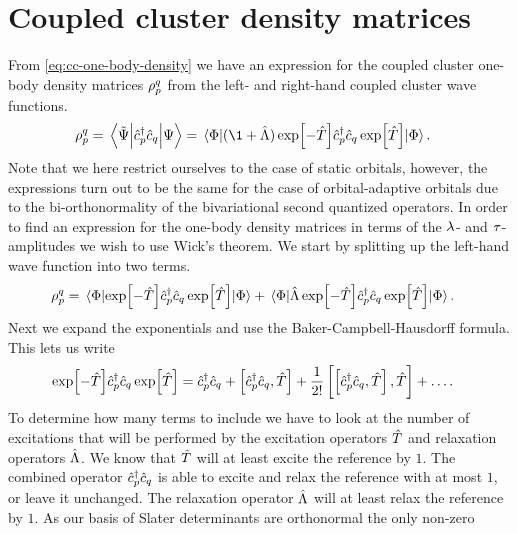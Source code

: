 \chapter{Coupled cluster density matrices}
    \label{app:cc-density-matrices}
    From \autoref{eq:cc-one-body-density} we have an expression for the coupled
    cluster one-body density matrices $\rho^q_p$ from the left- and
    right-hand coupled cluster wave functions.
    \begin{align}
        \densityten^{q}_{p}
        &= \mel{\tilde{\Psi}}{\ccr{p}\can{q}}{\Psi}
        = \mel{\slat}{
            (\1 + \clustl)
            \exp[-\clust]
            \ccr{p}\can{q}
            \exp[\clust]
        }{\slat}.
    \end{align}
    Note that we here restrict ourselves to the case of static orbitals,
    however, the expressions turn out to be the same for the case of
    orbital-adaptive orbitals due to the bi-orthonormality of the bivariational
    second quantized operators.
    In order to find an expression for the one-body density matrices in terms of
    the $\lambda$- and $\tau$-amplitudes we wish to use Wick's theorem.
    We start by splitting up the left-hand wave function into two terms.
    \begin{align}
        \rho^q_p
        &= \mel{\Phi}{
            \exp[-\hat{T}]
            \hat{c}_{p}^{\dagger}\hat{c}_{q}
            \exp[\hat{T}]
        }{\Phi}
        + \mel{\Phi}{
            \hat{\Lambda}\exp[-\hat{T}]
            \hat{c}_{p}^{\dagger}\hat{c}_{q}
            \exp[\hat{T}]
        }{\Phi}.
    \end{align}
    Next we expand the exponentials and use the Baker-Campbell-Hausdorff
    formula.
    This lets us write
    \begin{align}
        \exp[-\hat{T}]
        \hat{c}_{p}^{\dagger}\hat{c}_{q}
        \exp[\hat{T}]
        &= \hat{c}_{p}^{\dagger}\hat{c}_{q}
        + \left[\hat{c}_{p}^{\dagger}\hat{c}_{q}, \hat{T}\right]
        + \frac{1}{2!}\left[\left[\hat{c}_{p}^{\dagger}\hat{c}_{q}, \hat{T}\right], \hat{T}\right]
        + \dots.
    \end{align}
    To determine how many terms to include we have to look at the number of
    excitations that will be performed by the excitation operators $\hat{T}$ and
    relaxation operators $\hat{\Lambda}$.
    We know that $\hat{T}$ will at least excite the reference by $1$.
    The combined operator $\hat{c}_{p}^{\dagger}\hat{c}_{q}$ is able to excite and relax the
    reference with at most $1$, or leave it unchanged.
    The relaxation operator $\hat{\Lambda}$ will at least relax the reference by $1$.
    As our basis of Slater determinants are orthonormal the only non-zero
